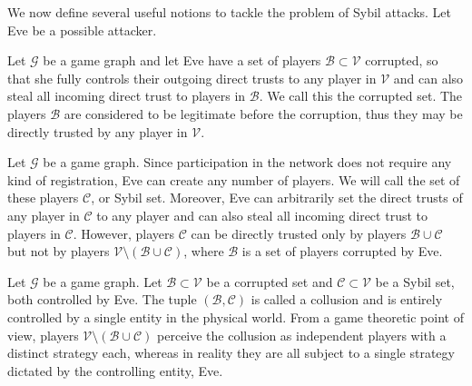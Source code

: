 \documentclass[11pt]{llncs}
\theoremstyle{definition}
\begin{document}
     We now define several useful notions to tackle the problem of Sybil attacks. Let Eve be a possible attacker.
     \begin{definition}
        Let $\mathcal{G}$ be a game graph and let Eve have a set of players $\mathcal{B} \subset \mathcal{V}$ corrupted, so
        that she fully controls their outgoing direct trusts to any player in $\mathcal{V}$ and can also steal all incoming
        direct trust to players in $\mathcal{B}$. We call this the corrupted set. The players $\mathcal{B}$ are considered to
        be legitimate before the corruption, thus they may be directly trusted by any player in $\mathcal{V}$.
     \end{definition}
     \begin{definition}
        Let $\mathcal{G}$ be a game graph. Since participation in the network does not require any kind of registration, Eve
        can create any number of players. We will call the set of these players $\mathcal{C}$, or Sybil set. Moreover, Eve
        can arbitrarily set the direct trusts of any player in $\mathcal{C}$ to any player and can also steal all
        incoming direct trust to players in $\mathcal{C}$. However, players $\mathcal{C}$ can be directly trusted only by
        players $\mathcal{B} \cup \mathcal{C}$ but not by players $\mathcal{V} \setminus (\mathcal{B} \cup \mathcal{C})$,
        where $\mathcal{B}$ is a set of players corrupted by Eve.
     \end{definition}
     \begin{definition}[Collusion]
        Let $\mathcal{G}$ be a game graph. Let $\mathcal{B} \subset \mathcal{V}$ be a corrupted set and $\mathcal{C} \subset
        \mathcal{V}$ be a Sybil set, both controlled by Eve. The tuple $\left(\mathcal{B}, \mathcal{C}\right)$ is called a
        collusion and is entirely controlled by a single entity in the physical world. From a game theoretic point of view,
        players $\mathcal{V} \setminus (\mathcal{B} \cup \mathcal{C})$ perceive the collusion as independent players with a
        distinct strategy each, whereas in reality they are all subject to a single strategy dictated by the controlling
        entity, Eve.
     \end{definition}
\end{document}
